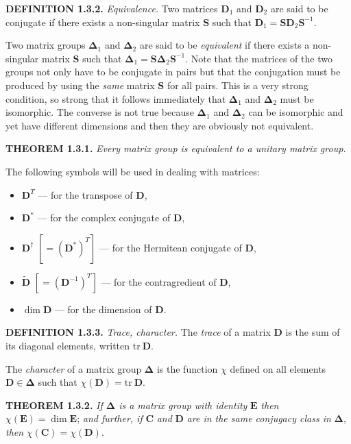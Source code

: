 \documentclass[11pt,a4paper,twoside,openright]{book}
\begin{document}
\textbf{DEFINITION 1.3.2.} \textit{Equivalence.} Two matrices $\mathbf{D}_{1}$ and $\mathbf{D}_{2}$ are said to be conjugate if there exists a non-singular matrix $\mathbf{S}$ such that $\mathbf{D}_{1} = \mathbf{S}\mathbf{D}_{2}\mathbf{S}^{-1}$.

Two matrix groups $\boldsymbol{\Delta}_{1}$ and $\boldsymbol{\Delta}_{2}$ are said to be \textit{equivalent} if there exists a non-singular matrix $\mathbf{S}$ such that $\boldsymbol{\Delta}_{1} = \mathbf{S}\boldsymbol{\Delta}_{2}\mathbf{S}^{-1}$. Note that the matrices of the two groups not only have to be conjugate in pairs but that the conjugation must be produced by using the \textit{same} matrix $\mathbf{S}$ for all pairs. This is a very strong condition, so strong that it follows immediately that $\boldsymbol{\Delta}_{1}$ and $\boldsymbol{\Delta}_{2}$ must be isomorphic. The converse is not true because $\boldsymbol{\Delta}_{1}$ and $\boldsymbol{\Delta}_{2}$ can be isomorphic and yet have different dimensions and then they are obviously not equivalent.

\textbf{THEOREM 1.3.1.} \textit{Every matrix group is equivalent to a unitary matrix group.}

The following symbols will be used in dealing with matrices:

\begin{itemize}
\item $\mathbf{D}^{T}$ — for the transpose of $\mathbf{D}$,
\item $\mathbf{D}^{*}$ — for the complex conjugate of $\mathbf{D}$,
\item $\mathbf{D}^{\dagger}$ $[= (\mathbf{D}^{*})^{T}]$ — for the Hermitean conjugate of $\mathbf{D}$,
\item $\tilde{\mathbf{D}}$ $[= (\mathbf{D}^{-1})^{T}]$ — for the contragredient of $\mathbf{D}$,
\item $\dim \mathbf{D}$ — for the dimension of $\mathbf{D}$.
\end{itemize}

\textbf{DEFINITION 1.3.3.} \textit{Trace, character.} The \textit{trace} of a matrix $\mathbf{D}$ is the sum of its diagonal elements, written $\mathrm{tr}\ \mathbf{D}$.

The \textit{character} of a matrix group $\boldsymbol{\Delta}$ is the function $\chi$ defined on all elements $\mathbf{D} \in \boldsymbol{\Delta}$ such that $\chi(\mathbf{D}) = \mathrm{tr}\ \mathbf{D}$.

\textbf{THEOREM 1.3.2.} \textit{If $\boldsymbol{\Delta}$ is a matrix group with identity} $\mathbf{E}$ \textit{then} $\chi(\mathbf{E}) = \dim \mathbf{E}$; \textit{and further, if} $\mathbf{C}$ \textit{and} $\mathbf{D}$ \textit{are in the same conjugacy class in} $\boldsymbol{\Delta}$, \textit{then} $\chi(\mathbf{C}) = \chi(\mathbf{D})$.
\end{document}
